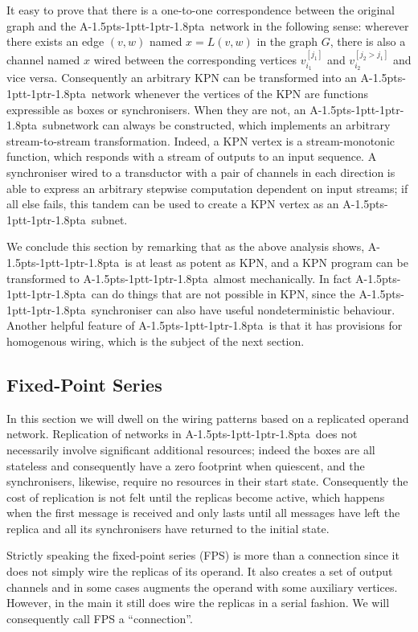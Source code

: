 \documentclass[11pt]{report}
\def\ak{{\textsf{A\kern-1.5pts\kern-1ptt\kern-1ptr\kern-1.8pta}}\kern-2pt{\it K\kern-2ptahn}}
\begin{document}
It easy to prove that there is a one-to-one correspondence between the original graph and the \ak\ network in the following sense:
wherever there exists an edge $(v,w)$ named $x=L(v,w)$ in the graph $G$, there is also a channel named $x$ wired between the corresponding vertices $v^{[j_1]}_{i_1}$ and $v^{[j_2>j_1]}_{i_2}$ and vice versa. Consequently an arbitrary KPN can be transformed into an \ak\ network
whenever the vertices of the KPN are functions expressible as boxes or synchronisers. When they are not, an \ak\ subnetwork can always be constructed, which implements an arbitrary stream-to-stream transformation. Indeed, a KPN vertex is a stream-monotonic function, which
responds with a stream of outputs to an input sequence. A synchroniser wired to a transductor with a pair of channels in each direction is able to express an arbitrary stepwise computation dependent on input streams; if all else fails, this tandem can be used to create a KPN vertex as an \ak\ subnet.

We conclude this section by remarking that as the above analysis shows, \ak\ is at least as potent as KPN, and a KPN program can be
transformed to \ak\ almost mechanically. In fact \ak\ can do things that are not possible in KPN, since the \ak\ synchroniser can also have useful nondeterministic behaviour. Another helpful feature of \ak\ is that it has provisions for homogenous wiring, which is the subject of the next section.


\subsection{Fixed-Point Series\label{sec:fps}}

In this section we will dwell on the wiring patterns based on a replicated operand network. Replication of networks
in \ak\ does not necessarily involve significant additional resources; indeed the boxes are all stateless and consequently have a zero footprint when quiescent, and the synchronisers, likewise, require no resources in their start state. Consequently the cost of replication is not felt until the replicas become active, which happens when the first message is received and only lasts until all messages have left the replica and all its synchronisers have returned to the initial state.

Strictly speaking the fixed-point series (FPS) is more than a connection since it does not simply wire the replicas of its operand. It also creates a set of output channels and in some cases augments the operand with some auxiliary vertices. However, in the main it still does wire the replicas in a serial fashion. We will consequently call FPS a ``connection''.
\end{document}
